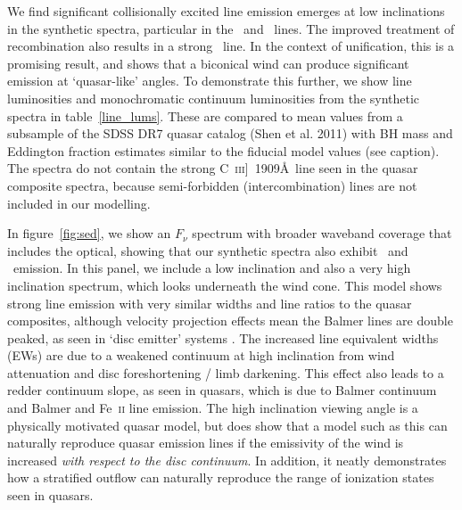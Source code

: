 \documentclass[useAMS,usenatbib]{mn2e_x}
\begin{document}
We find significant collisionally excited line emission emerges
at low inclinations in the synthetic spectra, particular in the \civ\ and \nv\
lines. The improved treatment of recombination also results in a strong \la\ line. 
In the context of unification, this is a promising result, 
and shows that a biconical wind can produce significant 
emission at `quasar-like' angles. To demonstrate this further,
we show line luminosities and monochromatic continuum luminosities
from the synthetic spectra in table~\ref{line_lums}. These are compared to
mean values from a subsample of the SDSS DR7 quasar catalog (Shen et al. 2011) 
with BH mass and Eddington fraction estimates similar to the fiducial model values 
(see caption). The spectra do not contain the strong 
C~\textsc{iii}]~1909\AA\, line seen in the quasar composite spectra,
because semi-forbidden (intercombination)
lines are not included in our modelling.

In figure~\ref{fig:sed}, we show an $F_{\nu}$ spectrum with broader waveband coverage
that includes the optical, showing that our synthetic spectra 
also exhibit \ha\ and \hb\ emission. 
In this panel, we include a low inclination and 
also a very high inclination 
spectrum, which looks underneath the wind cone. This model shows 
strong line emission with very similar widths and line ratios to the quasar composites,
although velocity projection effects mean the Balmer lines are double peaked, 
as seen  in `disc emitter' systems \citep[e.g.][]{eracleous1994}.
The increased line equivalent widths (EWs) are due to a weakened continuum at high inclination from wind attenuation and 
disc foreshortening / limb darkening. This effect also 
leads to a redder continuum slope, as seen in quasars, which is
due to Balmer continuum and Balmer and Fe~\textsc{ii} line emission.
The high inclination viewing angle is a physically motivated quasar model,
but does show that a model such as this can naturally reproduce quasar emission lines
if the emissivity of the wind is increased {\em with respect to the disc continuum}.
In addition, it neatly demonstrates how a stratified outflow can naturally
reproduce the range of ionization states seen in quasars.
\end{document}

